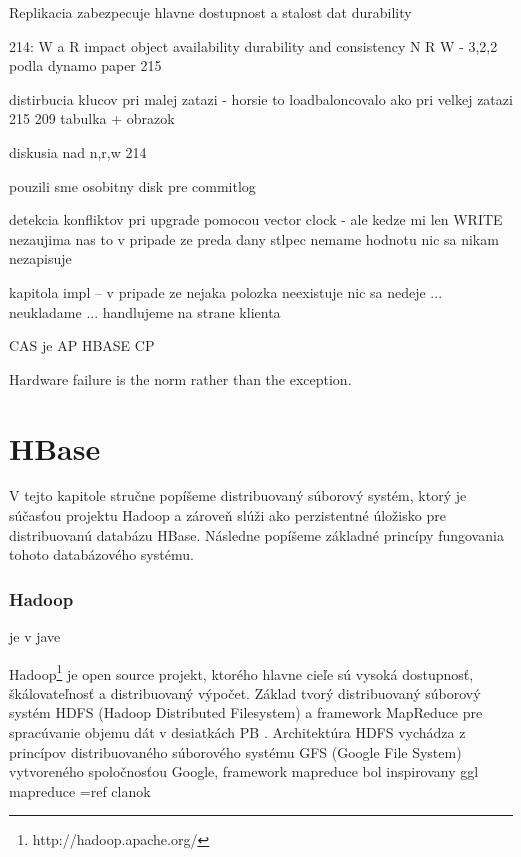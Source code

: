 \documentclass[11pt,twoside,a4paper]{book}
\begin{document}
Replikacia zabezpecuje hlavne dostupnost a stalost dat {durability}

214: W a R impact object availability durability and consistency 
N R W - 3,2,2 podla dynamo paper {215}

distirbucia klucov pri malej zatazi - horsie to loadbaloncovalo ako pri velkej zatazi  215
209 tabulka + obrazok

diskusia nad n,r,w 214

pouzili sme osobitny disk pre commitlog


detekcia konfliktov pri upgrade pomocou vector clock - ale kedze mi len WRITE nezaujima nas to
v pripade ze preda dany stlpec nemame hodnotu nic sa nikam nezapisuje


kapitola impl -- v pripade ze nejaka polozka neexistuje nic sa nedeje ... neukladame ... handlujeme na strane klienta


CAS je AP
HBASE CP


Hardware failure is the norm rather than the exception.

\chapter{HBase}
V tejto kapitole stručne popíšeme distribuovaný súborový systém, ktorý je súčasťou projektu Hadoop a zároveň slúži ako perzistentné úložisko pre distribuovanú databázu HBase. Následne popíšeme základné princípy fungovania tohoto databázového systému.

\subsection*{Hadoop}

je v jave

Hadoop\footnote{http://hadoop.apache.org/} je open source projekt, ktorého hlavne cieľe sú vysoká dostupnosť, škálovateľnosť a distribuovaný výpočet. Základ tvorý distribuovaný súborový systém HDFS (Hadoop Distributed Filesystem) a framework MapReduce pre spracúvanie objemu dát v desiatkách PB \cite{Thusoo:2010:DWA:1807167.1807278}. Architektúra HDFS vychádza z princípov distribuovaného súborového systému GFS (Google File System) vytvoreného spoločnosťou Google\cite{Ghemawat:2003:GFS:945445.945450}, framework mapreduce bol inspirovany ggl mapreduce =ref clanok
\end{document}
